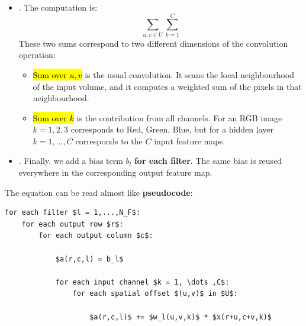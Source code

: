 \begin{itemize}
    \item[\textcolor{Green3}{\faIcon{plus-circle}}] . The computation is:
    \begin{equation*}
        \sum_{u,v \in U} \sum_{k=1}^{C}
    \end{equation*}
    These two sums correspond to two different dimensions of the convolution operation:
    \begin{itemize}
        \item \hl{Sum over $u,v$} is the usual convolution. It scans the local neighbourhood of the input volume, and it computes a weighted sum of the pixels in that neighbourhood.
        \item \hl{Sum over $k$} is the contribution from all channels. For an RGB image $k=1,2,3$ corresponds to Red, Green, Blue, but for a hidden layer $k=1,\dots,C$ corresponds to the $C$ input feature maps.
    \end{itemize}


    \item[\textcolor{Green3}{\faIcon{plus}}] . Finally, we add a bias term $b_l$ \textbf{for each filter}. The same bias is reused everywhere in the corresponding output feature map.
\end{itemize}
The equation can be read almost like \textbf{pseudocode}:
\begin{lstlisting}[mathescape=true,language={}]
for each filter $l = 1,...,N_F$:
    for each output row $r$:
        for each output column $c$:

            $a(r,c,l) = b_l$

            for each input channel $k = 1, \dots ,C$:
                for each spatial offset $(u,v)$ in $U$:

                    $a(r,c,l)$ += $w_l(u,v,k)$ * $x(r+u,c+v,k)$
\end{lstlisting}

\newpage


